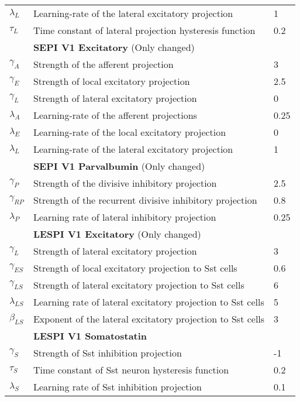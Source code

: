 {\begin{tabular}{ l l l }
	$\lambda_L$ & Learning-rate of the lateral excitatory projection & 1 \\
	$\tau_L$ & Time constant of lateral projection hysteresis function & 0.2 \\
	\ & \textbf{SEPI V1 Excitatory} (Only changed)  & \  \\
	$\gamma_A$ & Strength of the afferent projection & 3 \\
	$\gamma_E$ & Strength of local excitatory projection & 2.5 \\
	$\gamma_L$ & Strength of lateral excitatory projection & 0 \\
	$\lambda_A$ & Learning-rate of the afferent projections & 0.25 \\
	$\lambda_E$ & Learning-rate of the local excitatory projection & 0 \\
	$\lambda_L$ & Learning-rate of the lateral excitatory projection & 1 \\
	\ & \textbf{SEPI V1 Parvalbumin} (Only changed)  & \  \\
	$\gamma_P$ & Strength of the divisive inhibitory projection & 2.5 \\
	$\gamma_{RP}$ & Strength of the recurrent divisive inhibitory projection & 0.8 \\
	$\lambda_P$ & Learning rate of lateral inhibitory projection & 0.25 \\
	\ & \textbf{LESPI V1 Excitatory} (Only changed) & \  \\
	$\gamma_L$ & Strength of lateral excitatory projection & 3 \\
	$\gamma_{ES}$ & Strength of local excitatory projection to Sst cells & 0.6 \\
	$\gamma_{LS}$ & Strength of lateral excitatory projection to Sst cells & 6 \\
	$\lambda_{LS}$ & Learning rate of lateral excitatory projection to Sst cells & 5 \\
	$\beta_{LS}$ & Exponent of the lateral excitatory projection to Sst cells & 3 \\
	\ & \textbf{LESPI V1 Somatostatin} & \  \\
	$\gamma_S$ & Strength of Sst inhibition projection & -1 \\
	$\tau_S$ & Time constant of Sst neuron hysteresis function & 0.2 \\
	$\lambda_S$ & Learning rate of Sst inhibition projection & 0.1 \\
\end{tabular}}

